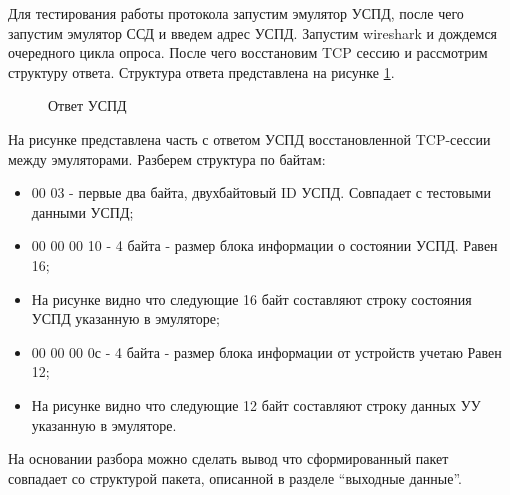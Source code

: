 Для тестирования работы протокола запустим эмулятор УСПД, после чего запустим эмулятор ССД и введем адрес УСПД. Запустим wireshark\cite{nix} и дождемся очередного цикла опроса. После чего восстановим TCP сессию и рассмотрим структуру ответа. Структура ответа представлена на рисунке \ref{img:test_pachete}.

\begin{figure}[ht!]
 \caption{Ответ УСПД}
 \label{img:test_pachete}
\end{figure}

На рисунке представлена часть с ответом УСПД восстановленной TCP-сессии между эмуляторами. Разберем структура по байтам:

\begin{itemize}
 \item 00 03 - первые два байта, двухбайтовый ID УСПД. Совпадает с тестовыми данными УСПД;
 \item 00 00 00 10 - 4 байта - размер блока информации о состоянии УСПД. Равен 16;
 \item На рисунке видно что следующие 16 байт составляют строку состояния УСПД указанную в эмуляторе;
 \item 00 00 00 0с - 4 байта - размер блока информации от устройств учетаю Равен 12;
 \item На рисунке видно что следующие 12 байт составляют строку данных УУ указанную в эмуляторе.
\end{itemize}

На основании разбора можно сделать вывод что сформированный пакет совпадает со структурой пакета, описанной в разделе ``выходные данные''.